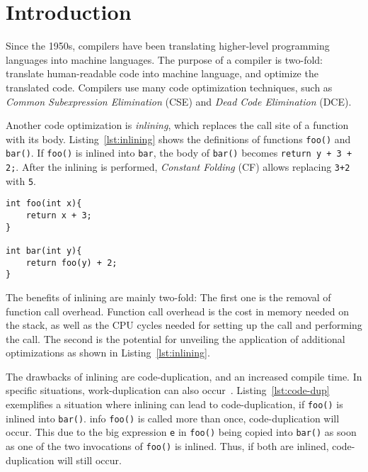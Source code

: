 
\section{Introduction}
\label{introduction}

Since the 1950s, compilers have been translating higher-level programming
languages into machine languages. The purpose of a compiler is two-fold:
translate human-readable code into machine language, and optimize the translated
code. Compilers use many code optimization techniques, such as \textit{Common Subexpression Elimination} (CSE) and
\textit{Dead Code Elimination} (DCE).

Another code optimization is \textit{inlining}, which replaces the call site of
a function with its body. Listing~\ref{lst:inlining} shows the definitions of
functions \lstinline!foo()! and \lstinline!bar()!. If \lstinline!foo()! is
inlined into \lstinline!bar!, the body of \lstinline!bar()! becomes
\lstinline!return y + 3 + 2;!. After the inlining is performed, \textit{Constant
Folding} (CF) allows replacing \lstinline!3+2! with \lstinline!5!.

\begin{centering}
	\noindent\begin{minipage}{\textwidth}
		\begin{CenteredBox}
		\begin{lstlisting}[style=global_customcpp]
int foo(int x){
	return x + 3;
}

int bar(int y){
	return foo(y) + 2;
}
		\end{lstlisting}
		\end{CenteredBox}
	\end{minipage}
	\label{lst:inlining}
\end{centering}

The benefits of inlining are mainly two-fold: The first one is the removal of
function call overhead. Function call overhead is the cost in memory needed on
the stack, as well as the CPU cycles needed for setting up the call and
performing the call. The second is the potential for unveiling the application
of additional optimizations as shown in Listing~\ref{lst:inlining}.

The drawbacks of inlining are code-duplication, and an increased compile time.
In specific situations, work-duplication can also occur~\cite{GHCPaper}.
Listing~\ref{lst:code-dup} exemplifies a situation where inlining can lead to
code-duplication, if \lstinline!foo()! is inlined into \lstinline!bar()!. info
\lstinline!foo()! is called more than once, code-duplication will occur. This
due to the big expression \lstinline!e! in \lstinline!foo()! being copied into
\lstinline!bar()! as soon as one of the two invocations of \lstinline!foo()! is
inlined. Thus, if both are inlined, code-duplication will still occur.

